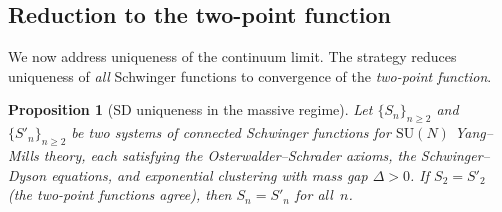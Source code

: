 \documentclass[11pt,a4paper]{article}
\theoremstyle{plain}
\newtheorem{proposition}[theorem]{Proposition}
\theoremstyle{definition}
\theoremstyle{remark}
\newcommand{\SU}{\mathrm{SU}}
\begin{document}
\subsection{Reduction to the two-point function}

We now address uniqueness of the continuum limit.  The
strategy reduces uniqueness of \emph{all} Schwinger
functions to convergence of the \emph{two-point function}.

\begin{proposition}[SD uniqueness in the massive regime]
\label{prop:sd_unique}
Let $\{S_n\}_{n \geq 2}$ and $\{S'_n\}_{n \geq 2}$ be
two systems of connected Schwinger functions for $\SU(N)$
Yang--Mills theory, each satisfying the
Osterwalder--Schrader axioms, the Schwinger--Dyson equations,
and exponential clustering with mass gap $\Delta > 0$.
If $S_2 = S'_2$
\textup{(}the two-point functions agree\textup{)},
then $S_n = S'_n$ for all~$n$.
\end{proposition}
\end{document}
